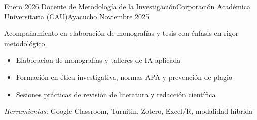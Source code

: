\experience
{Enero 2026} {Docente de Metodología de la Investigación}{Corporación Académica Universitaria (CAU)}{Ayacucho}
{Noviembre 2025} {
	Acompañamiento en elaboración de monografías y tesis con énfasis en rigor metodológico.
	\begin{itemize}
		\item Elaboracion de monografías y talleres de IA aplicada
		\item Formación en ética investigativa, normas APA y prevención de plagio
		\item Sesiones prácticas de revisión de literatura y redacción científica
	\end{itemize}
}
{\footnotesize{\emph{Herramientas:} Google Classroom, Turnitin, Zotero, Excel/R, modalidad híbrida}}
